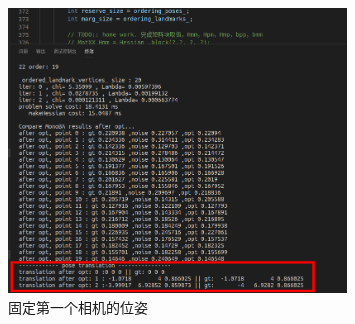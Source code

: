 \documentclass[UTF8]{ctexart}
\begin{document}
\begin{figure}[H]
\centering
\includegraphics[width=0.8\textwidth]{1_1_1.jpg}    
\caption{固定第一个相机的位姿}
\label{img0}
\end{figure}
\end{document}
